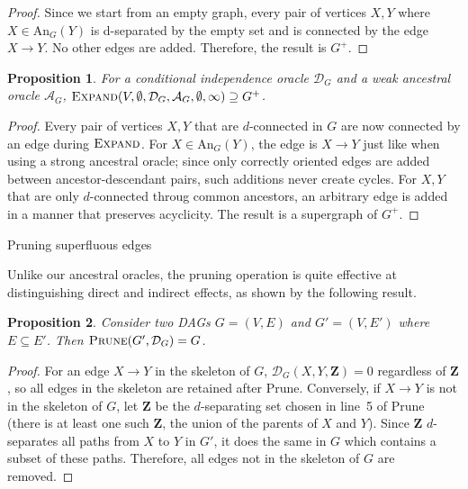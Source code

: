 \documentclass{uai2025} %
\newtheorem{proposition}{Proposition}
\begin{document}
\begin{proof}
Since we start from an empty graph, every pair of vertices $X, Y$ where
 $X \in \textrm{An}_G(Y)$ is d-separated by the empty set and is
 connected by the edge $X \to Y$. No other edges are added. Therefore, 
the result is $G^+$. 
\end{proof}

\begin{proposition}
For a conditional independence oracle
 $\mathcal{D}_G$ and a weak ancestral oracle $\mathcal{A}_G$, 
$\textsc{Expand}(V,\emptyset,\mathcal{D}_G,\mathcal{A}_G, \emptyset, \infty)
\supseteq G^+$.
\label{prop:weakexpand}
\end{proposition}

\begin{proof}
Every pair of vertices $X, Y$ that are $d$-connected in $G$ are now connected by an edge 
during $\textsc{Expand}$. For $X \in \textrm{An}_G(Y)$, the edge is 
$X \to Y$ just like when using a strong ancestral oracle; since only correctly oriented
edges are added between ancestor-descendant pairs, such additions never create cycles.
For $X, Y$ that are only $d$-connected throug common ancestors, an arbitrary 
edge is added in a manner that preserves acyclicity. The result is a supergraph
of $G^+$.
\end{proof}


\begin{algorithm}[h]
\DontPrintSemicolon
\SetAlgoLined

\caption{Pruning superfluous edges}
\label{algo:prune}
\end{algorithm}

Unlike our ancestral oracles, the pruning operation is quite effective at distinguishing
direct and indirect effects, as shown by the following result.

\begin{proposition}
Consider two DAGs $G=(V,E)$ and $G'=(V,E')$ where $E \subseteq E'$. 
Then $\textsc{Prune}(G',\mathcal{D}_G)=G$.
\label{prop:prune}
\end{proposition}

\begin{proof}
For an edge $X \to Y$ in the skeleton of $G$, $\mathcal{D}_G(X, Y, \mathbf{Z}) = 0$ regardless 
of $\mathbf{Z}$, so all edges in the skeleton are retained after {\sc Prune}. Conversely, if 
 $X \to Y$ is not in the skeleton of $G$, let $\mathbf{Z}$ be the $d$-separating set chosen 
in line~5 of {\sc Prune} (there is at least one such $\mathbf{Z}$, the union of the parents of 
$X$ and $Y$). Since  $\mathbf{Z}$ $d$-separates all paths from $X$ to $Y$ in $G'$, it does the same 
in $G$ which contains a subset of these paths. Therefore, all edges not in the skeleton of $G$ are 
removed.
\end{proof}
\end{document}
